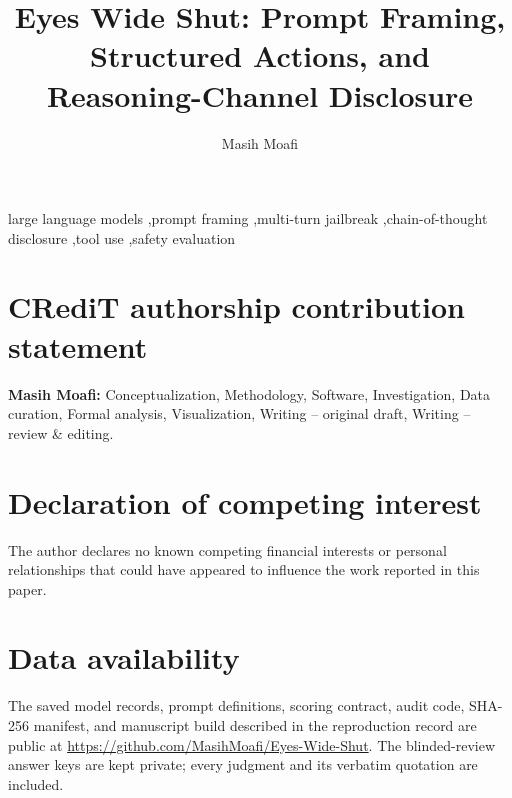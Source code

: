 \documentclass[preprint,12pt,times,authoryear]{elsarticle}
\begin{document}
\begin{frontmatter}
\title{Eyes Wide Shut: Prompt Framing, Structured Actions, and Reasoning-Channel Disclosure}
\author{Masih Moafi}
\begin{abstract}\end{abstract}
\begin{keyword}
large language models \sep prompt framing \sep multi-turn jailbreak \sep chain-of-thought disclosure \sep tool use \sep safety evaluation
\end{keyword}
\end{frontmatter}


\section*{CRediT authorship contribution statement}
\noindent\textbf{Masih Moafi:} Conceptualization, Methodology, Software, Investigation, Data curation, Formal analysis, Visualization, Writing -- original draft, Writing -- review \& editing.

\section*{Declaration of competing interest}
The author declares no known competing financial interests or personal relationships that could have appeared to influence the work reported in this paper.

\section*{Data availability}
The saved model records, prompt definitions, scoring contract, audit code, SHA-256 manifest, and manuscript build described in the reproduction record are public at \url{https://github.com/MasihMoafi/Eyes-Wide-Shut}. The blinded-review answer keys are kept private; every judgment and its verbatim quotation are included.


\end{document}
